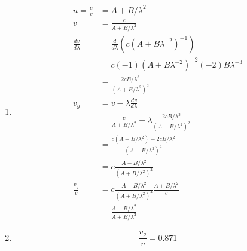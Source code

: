 \documentclass{article}
\begin{document}
\begin{enumerate}
  \item

        \begin{align*}
          n = \frac{c}{v}       & = A + B / \lambda^2                                                                     \\
          v                     & = \frac{c}{A + B / \lambda^2}                                                           \\
          \frac{d v}{d \lambda} & = \frac{d}{d \lambda} (c (A + B \lambda^{-2})^{-1})                                     \\
                                & = c (-1) (A + B \lambda^{-2})^{-2} (-2) B \lambda^{-3}                                  \\
                                & = \frac{2 c B / \lambda^3}{(A + B / \lambda^2)^2}                                       \\
          v_g                   & = v - \lambda \frac{d v}{d \lambda}                                                     \\
                                & = \frac{c}{A + B / \lambda^2} - \lambda \frac{2 c B / \lambda^3}{(A + B / \lambda^2)^2} \\
                                & = \frac{c (A + B / \lambda^2) - 2 c B / \lambda^2}{(A + B / \lambda^2)^2}               \\
                                & = c \frac{A - B / \lambda^2}{(A + B / \lambda^2)^2}                                     \\
          \frac{v_g}{v}         & = c \frac{A - B / \lambda^2}{(A + B / \lambda^2)^2} \frac{A + B / \lambda^2}{c}         \\
                                & = \frac{A - B / \lambda^2}{A + B / \lambda^2}
        \end{align*}

  \item \[\frac{v_g}{v} = 0.871\]
\end{enumerate}

\subsection{}
\end{document}
